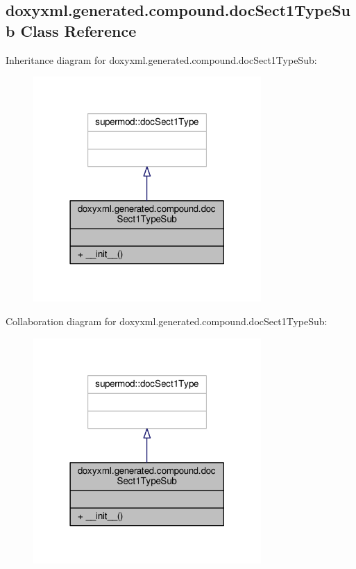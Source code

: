 \subsection{doxyxml.\+generated.\+compound.\+doc\+Sect1\+Type\+Sub Class Reference}
\label{classdoxyxml_1_1generated_1_1compound_1_1docSect1TypeSub}


Inheritance diagram for doxyxml.\+generated.\+compound.\+doc\+Sect1\+Type\+Sub\+:
\nopagebreak
\begin{figure}[H]
\begin{center}
\leavevmode
\includegraphics[width=246pt]{d6/d73/classdoxyxml_1_1generated_1_1compound_1_1docSect1TypeSub__inherit__graph}
\end{center}
\end{figure}


Collaboration diagram for doxyxml.\+generated.\+compound.\+doc\+Sect1\+Type\+Sub\+:
\nopagebreak
\begin{figure}[H]
\begin{center}
\leavevmode
\includegraphics[width=246pt]{d4/d03/classdoxyxml_1_1generated_1_1compound_1_1docSect1TypeSub__coll__graph}
\end{center}
\end{figure}
